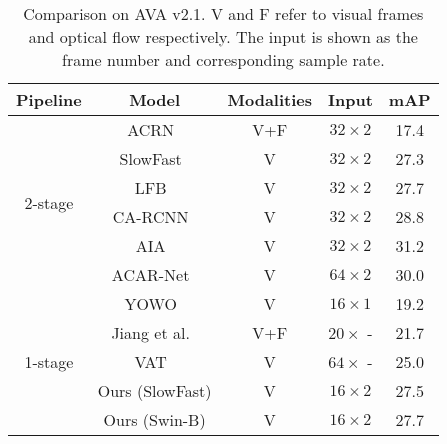 \documentclass[final]{cvpr}
\begin{document}
\begin{table} [t]
\begin{center}
\small
\begin{tabular}{c|c|c|c|c}
\toprule
Pipeline & Model & Modalities & Input & mAP  \\
\midrule
\multirow{6}{3em}{2-stage}
& ACRN~\cite{DBLP:conf/eccv/SunSVMSS18} & V+F & $32\times 2$ & 17.4 \\
& SlowFast~\cite{feichtenhofer2019slowfast} & V & $32\times 2$ & 27.3 \\
& LFB~\cite{Wu_2019_CVPR} & V & $32\times 2$ & 27.7 \\
& CA-RCNN~\cite{DBLP:conf/eccv/WuKWZW20} & V & $32\times 2$ & 28.8 \\
& AIA~\cite{DBLP:conf/eccv/TangXMPL20} & V & $32\times 2$ &31.2 \\
& ACAR-Net~\cite{DBLP:conf/cvpr/PanCSLS021} & V & $64\times 2$ & 30.0 \\
\midrule
\multirow{5}{3em}{1-stage}
& YOWO~\cite{kopuklu2019yowo}& V & $16\times 1$ & 19.2 \\
& Jiang et al.~\cite{jiang2018human}& V+F & $20\times$ -  & 21.7 \\
& VAT~\cite{Girdhar_2019_CVPR} & V & $64\times$ - & 25.0 \\
& Ours (SlowFast) & V & $16\times 2$ & 27.5 \\
& Ours (Swin-B) & V & $16\times 2$ & 27.7 \\
\bottomrule
\end{tabular}
\end{center}
\vspace{-5mm}
\caption{Comparison on AVA v2.1. V and F refer to visual frames and optical flow respectively. The input is shown as the frame number and corresponding sample rate.}
\vspace{-3mm}
\label{ava2.1}
\end{table}
\end{document}
